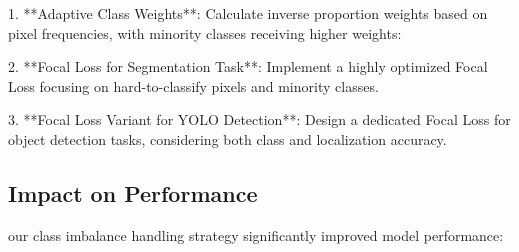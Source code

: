 \documentclass[conference]{IEEEtran}
\begin{document}


    
    

1. **Adaptive Class Weights**: Calculate inverse proportion weights based on pixel frequencies, with minority classes receiving higher weights:

2. **Focal Loss for Segmentation Task**: Implement a highly optimized Focal Loss focusing on hard-to-classify pixels and minority classes.

3. **Focal Loss Variant for YOLO Detection**: Design a dedicated Focal Loss for object detection tasks, considering both class and localization accuracy.


\subsection{Impact on Performance}






our class imbalance handling strategy significantly improved model performance:
\end{document}
